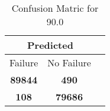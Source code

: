 \begin{table}[] 
\caption{Confusion Matric for 90.0} 
\label{Table: Prediction Accuracy-DMD90.0OnlySunEKF-combinationReflectionEKF-top2perfectNoFailurePrediction-Reflection} 
\centering 
\begin{tabular} 
 {@{}ccc@{}} 
\toprule 
\multicolumn{2}{c}{\textbf{Predicted}}
 \\ \midrule 
\multicolumn{1}{|c|}{Failure} & 
\multicolumn{1}{c|}{No Failure}
 \\ \midrule 
\multicolumn{1}{|c|}{\color{green}\textbf{89844}} & 
\multicolumn{1}{c|}{\color{red}\textbf{490}}
 \\ \midrule 
\multicolumn{1}{|c|}{\color{red}\textbf{108}} & 
\multicolumn{1}{c|}{\color{green}\textbf{79686}}
 \\ \bottomrule 
\end{tabular} 
\end{table} 
